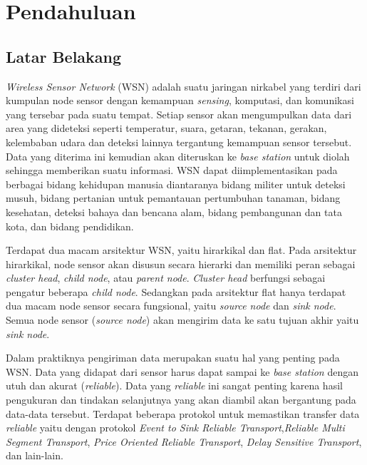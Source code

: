 \chapter{Pendahuluan}
\label{chap:intro}
   
\section{Latar Belakang}
\label{sec:label}

\textit{Wireless Sensor Network} (WSN) adalah suatu jaringan nirkabel yang terdiri dari kumpulan node sensor dengan kemampuan \textit{sensing}, komputasi, dan komunikasi yang tersebar pada suatu tempat. Setiap sensor akan mengumpulkan data dari area yang dideteksi seperti temperatur, suara, getaran, tekanan, gerakan, kelembaban udara dan deteksi lainnya tergantung kemampuan sensor tersebut. Data yang diterima ini kemudian akan diteruskan ke \textit{base station} untuk diolah sehingga memberikan suatu informasi. WSN dapat diimplementasikan pada berbagai bidang kehidupan manusia diantaranya bidang militer untuk deteksi musuh, bidang pertanian untuk pemantauan pertumbuhan tanaman, bidang kesehatan, deteksi bahaya dan bencana alam, bidang pembangunan dan tata kota, dan bidang pendidikan.

Terdapat dua macam arsitektur WSN, yaitu hirarkikal dan flat. Pada arsitektur hirarkikal, node sensor akan disusun secara hierarki dan memiliki peran sebagai \textit{cluster head}, \textit{child node}, atau \textit{parent node}. \textit{Cluster head} berfungsi sebagai pengatur beberapa \textit{child node}. Sedangkan pada arsitektur flat hanya terdapat dua macam node sensor secara fungsional, yaitu \textit{source node} dan \textit{sink node}. Semua node sensor (\textit{source node}) akan mengirim data ke satu tujuan akhir yaitu \textit{sink node}.

Dalam praktiknya pengiriman data merupakan suatu hal yang penting pada WSN. Data yang didapat dari sensor harus dapat sampai ke \textit{base station} dengan utuh dan akurat (\textit{reliable}). Data yang \textit{reliable} ini sangat penting karena hasil pengukuran dan tindakan selanjutnya yang akan diambil akan bergantung pada data-data tersebut. Terdapat beberapa protokol untuk memastikan transfer data \textit{reliable} yaitu dengan protokol \textit{Event to Sink Reliable Transport},\textit{Reliable Multi Segment Transport}, \textit{Price Oriented Reliable Transport}, \textit{Delay Sensitive Transport}, dan lain-lain.

